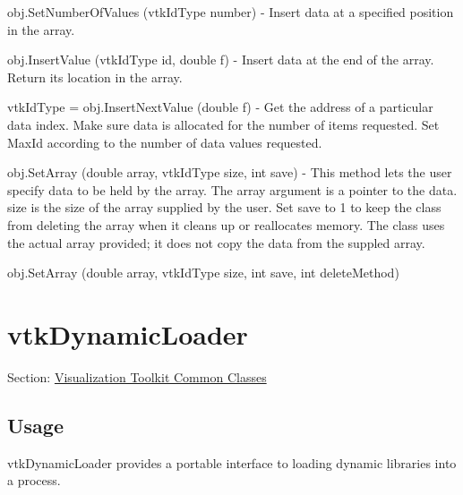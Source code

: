 \begin{DoxyItemize}
\item {\ttfamily obj.\-Set\-Number\-Of\-Values (vtk\-Id\-Type number)} -\/ Insert data at a specified position in the array.  
\item {\ttfamily obj.\-Insert\-Value (vtk\-Id\-Type id, double f)} -\/ Insert data at the end of the array. Return its location in the array.  
\item {\ttfamily vtk\-Id\-Type = obj.\-Insert\-Next\-Value (double f)} -\/ Get the address of a particular data index. Make sure data is allocated for the number of items requested. Set Max\-Id according to the number of data values requested.  
\item {\ttfamily obj.\-Set\-Array (double array, vtk\-Id\-Type size, int save)} -\/ This method lets the user specify data to be held by the array. The array argument is a pointer to the data. size is the size of the array supplied by the user. Set save to 1 to keep the class from deleting the array when it cleans up or reallocates memory. The class uses the actual array provided; it does not copy the data from the suppled array.  
\item {\ttfamily obj.\-Set\-Array (double array, vtk\-Id\-Type size, int save, int delete\-Method)}  
\end{DoxyItemize}\hypertarget{vtkcommon_vtkdynamicloader}{}\section{vtk\-Dynamic\-Loader}\label{vtkcommon_vtkdynamicloader}
Section\-: \hyperlink{sec_vtkcommon}{Visualization Toolkit Common Classes} \hypertarget{vtkwidgets_vtkxyplotwidget_Usage}{}\subsection{Usage}\label{vtkwidgets_vtkxyplotwidget_Usage}
vtk\-Dynamic\-Loader provides a portable interface to loading dynamic libraries into a process.

